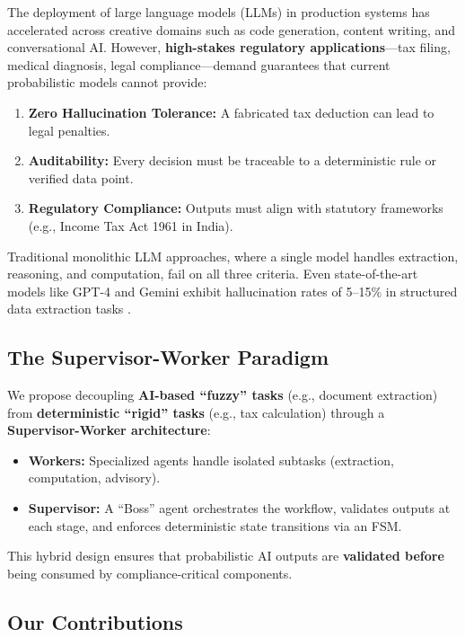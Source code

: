 \documentclass[conference]{IEEEtran}
\begin{document}
The deployment of large language models (LLMs) in production systems has accelerated across creative domains such as code generation, content writing, and conversational AI. However, \textbf{high-stakes regulatory applications}---tax filing, medical diagnosis, legal compliance---demand guarantees that current probabilistic models cannot provide:

\begin{enumerate}
    \item \textbf{Zero Hallucination Tolerance:} A fabricated tax deduction can lead to legal penalties.
    \item \textbf{Auditability:} Every decision must be traceable to a deterministic rule or verified data point.
    \item \textbf{Regulatory Compliance:} Outputs must align with statutory frameworks (e.g., Income Tax Act 1961 in India).
\end{enumerate}

Traditional monolithic LLM approaches, where a single model handles extraction, reasoning, and computation, fail on all three criteria. Even state-of-the-art models like GPT-4 and Gemini exhibit hallucination rates of 5--15\% in structured data extraction tasks \cite{openai2023gpt4}.

\subsection{The Supervisor-Worker Paradigm}

We propose decoupling \textbf{AI-based ``fuzzy'' tasks} (e.g., document extraction) from \textbf{deterministic ``rigid'' tasks} (e.g., tax calculation) through a \textbf{Supervisor-Worker architecture}:

\begin{itemize}
    \item \textbf{Workers:} Specialized agents handle isolated subtasks (extraction, computation, advisory).
    \item \textbf{Supervisor:} A ``Boss'' agent orchestrates the workflow, validates outputs at each stage, and enforces deterministic state transitions via an FSM.
\end{itemize}

This hybrid design ensures that probabilistic AI outputs are \textbf{validated before} being consumed by compliance-critical components.

\subsection{Our Contributions}
\end{document}
